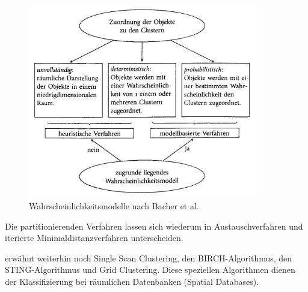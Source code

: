 \begin{figure}[h]
	\begin{center}
		\includegraphics[width=10cm]{pics/bac20.png}
	\end{center}
	\caption{Wahrscheinlichkeitsmodelle nach Bacher et al.}
	\label{pic:bac20}
\end{figure}

Die partitionierenden Verfahren lassen sich wiederum in Austauschverfahren und iterierte Minimaldistanzverfahren unterscheiden.

\citet{Xu.1999} erwähnt weiterhin noch Single Scan Clustering, den BIRCH-Algorithmus, den STING-Algorithmus und Grid Clustering. Diese speziellen Algorithmen dienen der Klassifizierung bei räumlichen Datenbanken (Spatial Databases).